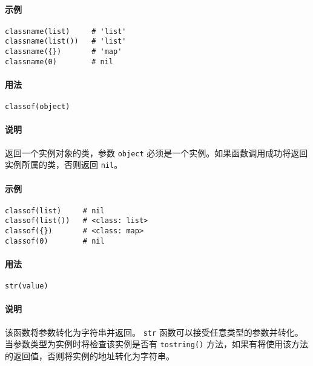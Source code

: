 \paragraph{示例}
\begin{lstlisting}[language=berry, numbers=none]
classname(list)     # 'list'
classname(list())   # 'list'
classname({})       # 'map'
classname(0)        # nil
\end{lstlisting}


\paragraph{用法}
\begin{lstlisting}[language=berry, numbers=none]
classof(object)
\end{lstlisting}

\paragraph{说明}
返回一个实例对象的类，参数 \texttt{object} 必须是一个实例。如果函数调用成功将返回实例所属的类，否则返回 \texttt{nil}。

\paragraph{示例}
\begin{lstlisting}[language=berry, numbers=none]
classof(list)     # nil
classof(list())   # <class: list>
classof({})       # <class: map>
classof(0)        # nil
\end{lstlisting}


\paragraph{用法}
\begin{lstlisting}[language=berry, numbers=none]
str(value)
\end{lstlisting}

\paragraph{说明}
该函数将参数转化为字符串并返回。 \texttt{str} 函数可以接受任意类型的参数并转化。当参数类型为实例时将检查该实例是否有 \texttt{tostring()} 方法，如果有将使用该方法的返回值，否则将实例的地址转化为字符串。


